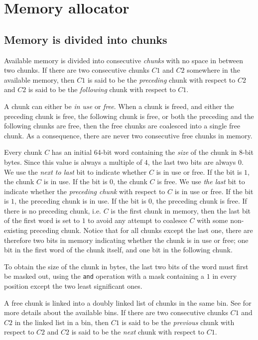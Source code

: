 \chapter{Memory allocator}
\label{app-memory-allocator}

\section{Memory is divided into chunks}
\label{sec-memory-allocator-memory-divided-into-chunks}

Available memory is divided into consecutive \emph{chunks} with no
space in between two chunks.  If there are two consecutive chunks $C1$
and $C2$ somewhere in the available memory, then $C1$ is said to be
the \emph{preceding} chunk with respect to $C2$ and $C2$ is said to be
the \emph{following} chunk with respect to $C1$.

A chunk can either be \emph{in use} or \emph{free}. When a chunk is
freed, and either the preceding chunk is free, the following chunk is
free, or both the preceding and the following chunks are free, then the
free chunks are coalesced into a single free chunk.  As a consequence,
there are never two consecutive free chunks in memory.

Every chunk $C$ has an initial 64-bit word containing the \emph{size}
of the chunk in 8-bit bytes.  Since this value is always a multiple of
$4$, the last two bits are always $0$.  We use the \emph{next to last}
bit to indicate whether $C$ is in use or free.  If the bit is $1$, the
chunk $C$ is in use.  If the bit is $0$, the chunk $C$ is free.  We
use \emph{the last} bit to indicate whether the \emph{preceding chunk}
with respect to $C$ is in use or free.  If the bit is $1$, the
preceding chunk is in use.  If the bit is $0$, the preceding chunk is
free.  If there is no preceding chunk, i.e. $C$ is the first chunk in
memory, then the last bit of the first word is set to $1$ to avoid any
attempt to coalesce $C$ with some non-existing preceding chunk.
Notice that for all chunks except the last one, there are therefore
two bits in memory indicating whether the chunk is in use or free; one
bit in the first word of the chunk itself, and one bit in the
following chunk.

To obtain the size of the chunk in bytes, the last two bits of
the word must first be masked out, using the \texttt{and} operation
with a mask containing a $1$ in every position except the two least
significant ones.

A free chunk is linked into a doubly linked list of chunks in the same
bin.  See  for more
details about the available bins.  If there are two consecutive chunks
$C1$ and $C2$ in the linked list in a bin, then $C1$ is said to be the
\emph{previous} chunk with respect to $C2$ and $C2$ is said to be the
\emph{next} chunk with respect to $C1$.

